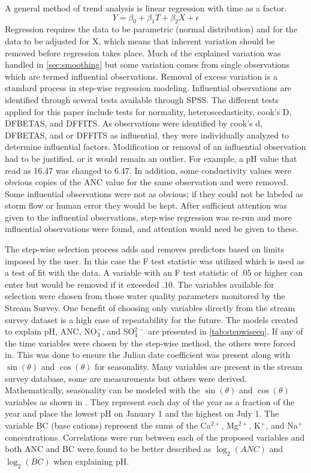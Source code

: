 A general method of trend analysis is linear regression with time as a factor.
\begin{equation} \label{eq:regression}
    Y={\beta_0 + \beta_1  T + \beta_2  X + \epsilon}
\end{equation}
Regression requires the data to be parametric (normal distribution) and for the data to be adjusted for X, which means that inherent variation should be removed before regression takes place.
Much of the explained variation was handled in \autoref{sec:smoothing} but some variation comes from single observations which are termed influential observations.
Removal of excess variation is a standard process in step-wise regression modeling.
Influential observations are identified through several tests available through SPSS.
The different tests applied for this paper include tests for normality, heteroscedasticity, cook's D, DFBETAS, and DFFITS. 
As observations were identified by cook's d, DFBETAS, and or DFFITS as influential, they were individually analyzed to determine influential factors. 
Modification or removal of an influential observation had to be justified, or it would remain an outlier. 
For example, a pH value that read as 16.47 was changed to 6.47.
In addition, some conductivity values were obvious copies of the ANC value for the same observation and were removed.
Some influential observations were not as obvious; if they could not be labeled as storm flow or human error they would be kept.
After sufficient attention was given to the influential observations, step-wise regression was re-run and more influential observations were found, and attention would need be given to these. 

The step-wise selection process adds and removes predictors based on limits imposed by the user.
In this case the F test statistic was utilized which is used as a test of fit with the data.
A variable with an F test statistic of .05 or higher can enter but would be removed if it exceeded .10. 
The variables available for selection were chosen from those water quality parameters monitored by the Stream Survey. 
One benefit of choosing only variables directly from the stream survey dataset is a high ease of repeatability for the future. 
The models created to explain pH, ANC, NO$_3^-$, and SO$_4^{2-}$ are presented in \autoref{tab:stepwiseeq}.
If any of the time variables were chosen by the step-wise method, the others were forced in.  
This was done to ensure the Julian date coefficient was present along with $\sin(\theta)$ and $\cos(\theta)$ for seasonality.  
Many variables are present in the stream survey database, some are measurements but others were derived.  
Mathematically, seasonality can be modeled with the $\sin(\theta)$ and $\cos(\theta)$ variables as shown in \citet{helsel1992statistical}. 
They represent each day of the year as a fraction of the year and place the lowest pH on January 1 and the highest on July 1.  
The variable BC (base cations) represent the sums of the Ca$^{2+}$, Mg$^{2+}$, K$^+$, and Na$^+$ concentrations.  
Correlations were run between each of the proposed variables  and both ANC and BC were found to be better described as $\log_2(ANC)$ and $\log_2(BC)$ when explaining pH.
 

